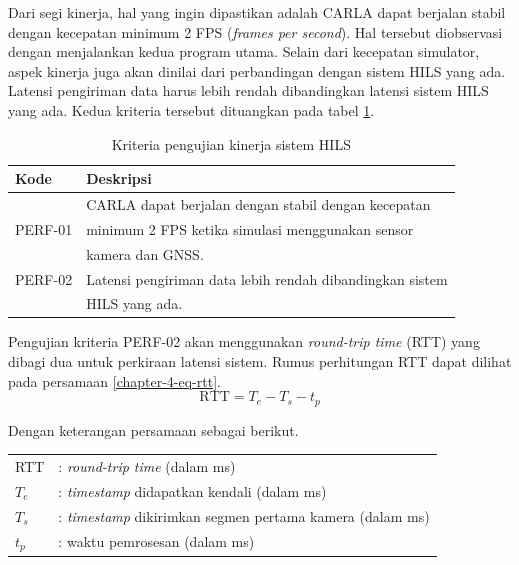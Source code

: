 Dari segi kinerja, hal yang ingin dipastikan adalah CARLA dapat berjalan stabil
dengan kecepatan minimum 2 FPS (\textit{frames per second}). Hal tersebut
diobservasi dengan menjalankan kedua program utama. Selain dari kecepatan
simulator, aspek kinerja juga akan dinilai dari perbandingan dengan sistem HILS
yang ada. Latensi pengiriman data harus lebih rendah dibandingkan latensi sistem
HILS yang ada. Kedua kriteria tersebut dituangkan pada tabel
\ref{chapter-4-tbl-perf-criteria}.
\begin{table}[!htbp]
	\begin{center}
		\begin{tabular}{|l|l|}
			\hline
			\textbf{Kode} & \textbf{Deskripsi}                                       \\
			\hline
			              & CARLA dapat berjalan dengan stabil dengan kecepatan      \\
			PERF-01       & minimum 2 FPS ketika simulasi menggunakan sensor         \\
			              & kamera dan GNSS.                                         \\
			\hline
			PERF-02       & Latensi pengiriman data lebih rendah dibandingkan sistem \\
			              & HILS yang ada.                                           \\
			\hline
		\end{tabular}
	\end{center}
	\caption{Kriteria pengujian kinerja sistem HILS}
	\label{chapter-4-tbl-perf-criteria}
\end{table}

Pengujian kriteria PERF-02 akan menggunakan \textit{round-trip time} (RTT) yang
dibagi dua untuk perkiraan latensi sistem. Rumus perhitungan RTT dapat dilihat
pada persamaan \ref{chapter-4-eq-rtt}.
\begin{equation}
	\label{chapter-4-eq-rtt}
	\text{RTT} = T_{e} - T_{s} - t_p
\end{equation}

Dengan keterangan persamaan sebagai berikut.
\begin{table}[!h]
	\begin{tabular}{l l}
		RTT     & :     \textit{round-trip time} (dalam ms)             \\
		$T_{e}$ & : \textit{timestamp} didapatkan kendali (dalam ms)    \\
		$T_{s}$ & : \textit{timestamp} dikirimkan segmen pertama kamera
		(dalam ms)                                                      \\
		$t_p$   & :   waktu pemrosesan (dalam ms)
	\end{tabular}
\end{table}

